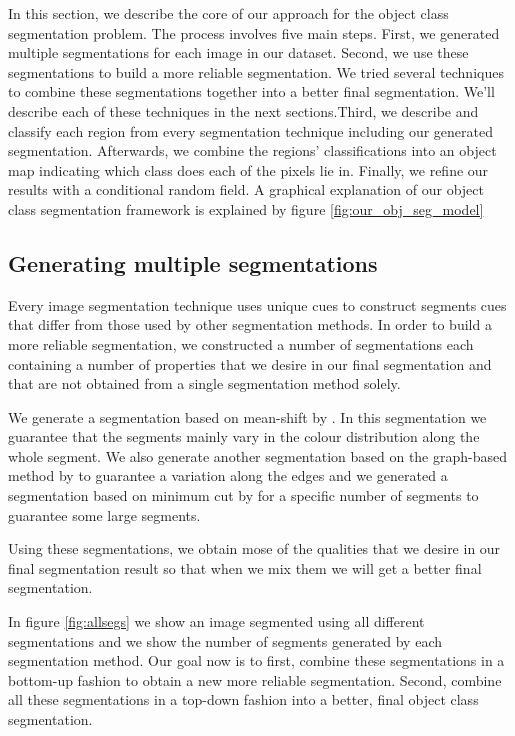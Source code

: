 \documentclass[twoside,11pt]{article}
\begin{document}
In this section, we describe the core of our approach for the object class
segmentation problem. The process involves five main steps. First, we
generated multiple segmentations for each image in our dataset. Second, we use
these segmentations to build a more reliable segmentation. We tried several
techniques to combine these segmentations together into a better final
segmentation.
We'll describe each of these techniques in the next sections.Third, we describe
and classify each region from every segmentation technique including our
generated
segmentation. Afterwards, we combine the regions' classifications into an object
map
indicating which class does each of the pixels lie in. Finally, we refine our
results with a conditional random field. A graphical explanation of our
object class segmentation framework is explained by figure \ref{fig:our_obj_seg_model}

\subsection{Generating multiple segmentations}

Every image segmentation technique uses unique cues to construct segments cues that
differ from those used by other segmentation methods.
In order to build a more reliable segmentation, we constructed a number of
segmentations each containing a number of properties that we desire in our final
segmentation and that are not obtained from a single segmentation method solely.

We generate a segmentation based on mean-shift by \cite{Comaniciu02meanshift}.
In this segmentation we guarantee that the segments mainly vary in the colour
distribution along the whole segment. We also generate another segmentation based
on the graph-based method by \cite{Felzenszwalb04efficientgraph-based} to
guarantee a variation along the edges and we generated a segmentation based on
minimum cut by \cite{Shi_2000_3808} for a specific number of segments to guarantee
some large segments.

Using these segmentations, we obtain mose of the qualities that we desire in our
final segmentation result so that when we mix them we will get a better final
segmentation.

In figure \ref{fig:allsegs} we show an image segmented using all different
segmentations and we show the number of segments generated by each segmentation
method. Our goal now is to first, combine these segmentations in a bottom-up fashion
to obtain a new more reliable segmentation. Second, combine all these segmentations
in a top-down fashion into a better, final object class segmentation.
\end{document}
